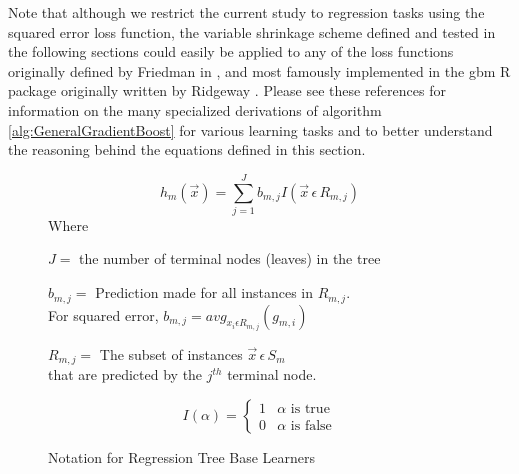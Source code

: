 \documentclass[9pt, conference]{IEEEtran}
\begin{document}
Note that although we restrict the current study to regression tasks using the squared error loss function, the variable shrinkage scheme defined and tested in the following sections could easily be applied to any of the loss functions originally defined by Friedman in \cite{2001Friedman} \cite{2002Friedman}, and most famously implemented in the gbm R package originally written by Ridgeway \cite{2012ridgeway}. Please see these references for information on the many specialized derivations of algorithm \ref{alg:GeneralGradientBoost} for various learning tasks and to better understand the reasoning behind the equations defined in this section.
\begin{figure}[t]
	
	\begin{equation}
	h_m(\vec{x}) = \sum_{j=1}^{J}b_{m,j}I(\vec{x} \, \epsilon \, R_{m,j})
	\end{equation}
	Where 
	\begin{center}
		\(J =\) the number of terminal nodes (leaves) in the tree 
	\end{center}
	\begin{center}
		\(b_{m,j} =\) Prediction made for all instances in \(R_{m,j}\).\\ 
		For squared error, \(b_{m,j} =  avg_{x_i \epsilon R_{m,j}}( g_{m, i}) \) 
	\end{center}
	\begin{center}
		\(R_{m,j} = \) The subset of instances \(\vec{x} \, \epsilon \, S_m\) \\
		that are predicted by the \(j^{th}\) terminal node.
	\end{center}
	
	\[ I(\alpha) = \begin{cases} 
	1 & \alpha \text{ is true} \\
	0 & \alpha \text{ is false}  
	\end{cases}
	\]
	\caption{Notation for Regression Tree Base Learners}
	\label{fig:regressionTreeFig}
\end{figure}	
\end{document}
